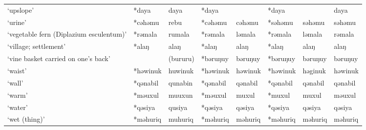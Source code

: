 \begin{landscape}
\begin{longtable}[c]{@{}p{3cm}<{\raggedright}p{2.75cm}<{\raggedright}p{2.75cm}<{\raggedright}p{2.75cm}<{\raggedright}p{2.75cm}<{\raggedright}p{2.75cm}<{\raggedright}p{2.75cm}<{\raggedright}p{2.75cm}<{\raggedright}@{}}
`upslope'                                            & *daya              & daya                           & *daya              &                            & *daya            &                          & daya                              \\
`urine'                                              & *cəhəmu            & rebu                           & *cəhəmu            & cəhəmu                     & *səhəmu          & səhəmu                   & səhəmu                            \\
`vegetable fern (Diplazium esculentum)'              & *rəmala            & rumala                         & *rəmala            & ləmala                     & *rəmala          & ləmala                   & rəmala                            \\
`village; settlement'                                & *alaŋ              & alaŋ                           & *alaŋ              & alaŋ                       & *alaŋ            & alaŋ                     & alaŋ                              \\
`vine basket carried on one's back'                  &    & (bururu)                         & *bəruŋuy           & bəruŋuy                    & *bəruŋuy         & bəruŋuy                  & bəruŋuy                           \\
`waist'                                              & *həwinuk           & huwinuk                        & *həwinuk           & həwinuk                    & *həwinuk         & həginuk                  & həwinuk                           \\
`wall'                                               & *qənabil           & qunabin                        & *qənabil           & qənabil                    & *qənabil         & qənabil                  & qənabil                           \\
`warm'                                               & *məuxul            & muuxun                         & *məuxul            & muxul                      & *muxul           & muxul                    & məuxul                            \\
`water'                                              & *qəsiya            & qusiya                         & *qəsiya            & qəsiya                     & *qəsiya          & qəsiya                   & qəsiya                            \\
`wet (thing)'                                        & *məhuriq           & muhuriq                        & *məhuriq           & məhuriq                    & *məhuriq         & məhuriq                  & məhuriq                           \\

\end{longtable}
\end{landscape}
